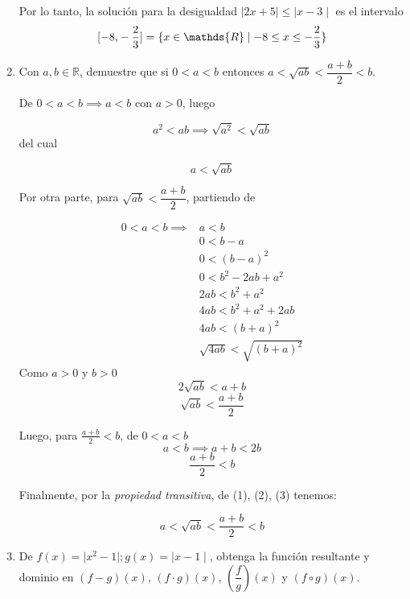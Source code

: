 \documentclass[a4paper,12pt]{report}
\begin{document}
\begin{enumerate}
Por lo tanto, la solución para la desigualdad $\mid 2x + 5 \mid \leq \mid x-3 \mid$ es el intervalo \\

\[ \interval[{-8,-\frac{2}{3}}] = \{ x \in \mathds{R} \mid -8 \leq x \leq -\frac{2}{3} \} \]


\item Con $a,b \in \mathds{R}$, demuestre que si $0<a<b$ entonces $a<\sqrt{ab}<\dfrac{a+b}{2}<b$.\\

\vspace{0.5cm}

De $0<a<b \implies a<b$ con $a>0$, luego

\[ a^2 < ab \implies \sqrt{a^2} < \sqrt{ab}\]
del cual

\begin{equation}
	a < \sqrt{ab}
\end{equation}

Por otra parte, para $\sqrt{ab}<\dfrac{a+b}{2}$, partiendo de

\begin{align*}
0<a<b \implies & a<b 
\\ & 0<b-a 
\\ & 0<(b-a)^2 
\\ & 0<b^2 -2ab + a^2
\\ & 2ab< b^2 + a^2
\\ & 4ab< b^2 + a^2 + 2ab
\\ & 4ab < (b+a)^2
\\ & \sqrt{4ab} < \sqrt{(b+a)^2}
\end{align*}
Como $a>0$ y $b>0$
\[2\sqrt{ab} < a+b\]
\begin{equation}
\sqrt{ab} < \frac{a+b}{2}
\end{equation}

Luego, para $\frac{a+b}{2} <b$, de $0<a<b$
\[a<b \implies a+b < 2b\]
\begin{equation}
 \frac{a+b}{2} < b
\end{equation}


Finalmente, por la \emph{propiedad transitiva}, de (1), (2), (3) tenemos:

\[ a<\sqrt{ab}<\frac{a+b}{2}<b \]

\newpage

\item De $f(x) = \mid x^2 - 1 \mid; g(x) = \mid x - 1\mid$, obtenga la función resultante y dominio en $(f-g)(x)$, $(f \cdot g)(x)$, $(\dfrac{f}{g})(x)$ y $(f \circ g)(x)$.

\vspace{0.5cm}


\end{enumerate}
\end{document}
